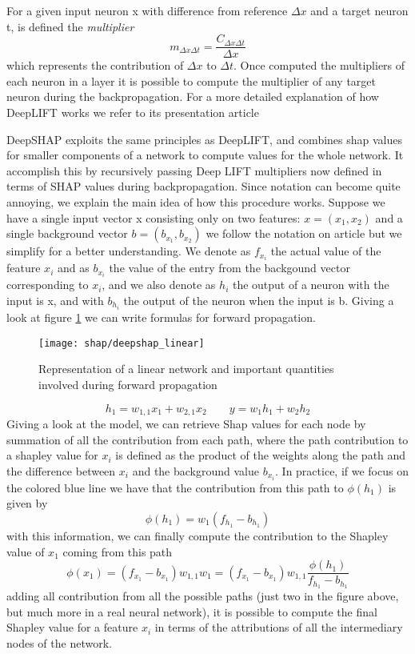 \documentclass[10pt]{report}
\begin{document}
For a given input neuron x with difference from reference $\Delta x$ and a target neuron t, is defined the \emph{multiplier}
\[
m_{\Delta x \Delta t} = \frac{C_{\Delta x \Delta t}}{\Delta x}
\]
which represents the contribution of $\Delta x$ to $\Delta t$. Once computed the multipliers of each neuron in a layer it is possible to compute the multiplier of any target neuron during the backpropagation.
For a more detailed explanation of how DeepLIFT works we refer to its presentation article \cite{shrikumar-2017}

DeepSHAP exploits the same principles as DeepLIFT, and combines shap values for smaller components of a network to compute values for the whole network. It accomplish this by recursively passing Deep LIFT multipliers now defined in terms of SHAP values during backpropagation.
Since notation can become quite annoying, we explain the main idea of how this procedure works.
Suppose we have a single input vector x consisting only on two features: $x = (x_1, x_2)$ and a single background vector $b = (b_{x_1}, b_{x_2})$ we follow the notation on article \cite{chen2019} but we simplify for a better understanding.
We denote as $f_{x_i}$ the actual value of the feature $x_i$ and as $b_{x_i}$ the value of the entry from the backgound vector corresponding to $x_i$, and we also denote as $h_i$ the output of a neuron with the input is x, and with $b_{h_i}$ the output of the neuron when the input is b.
Giving a look at figure \ref{fig:deepshap_linear} we can write formulas for forward propagation.

\begin{figure}[h!]
\centering
\texttt{[image: shap/deepshap\_linear]}
\caption{Representation of a linear network and important quantities involved during forward propagation}
\label{fig:deepshap_linear}
\end{figure}


\[
h_1 = w_{1, 1}x_1 + w_{2, 1}x_2 \qquad y = w_1 h_1 + w_2 h_2
\]
Giving a look at the model, we can retrieve Shap values for each node by summation of all the contribution from each path, where the path contribution to a shapley value for $x_i$ is defined as the product of the weights along the path and the difference between $x_i$ and the background value $b_{x_i}$.
In practice, if we focus on the colored blue line we have that the contribution from this path to $\phi(h_1)$ is given by
\[
\phi(h_1) = w_1 (f_{h_1} - b_{h_1})
\]
with this information, we can finally compute the contribution to the Shapley value of $x_1$ coming from this path
\begin{equation}
\phi(x_1) = (f_{x_1} - b_{x_1}) w_{1, 1} w_1 = (f_{x_1} - b_{x_1}) w_{1, 1} \frac{\phi(h_1)}{f_{h_1} - b_{h_1}}
\end{equation}
adding all contribution from all the possible paths (just two in the figure above, but much more in a real neural network), it is possible to compute the final Shapley value for a feature $x_i$ in terms of the attributions of all the intermediary nodes of the network.
\end{document}
